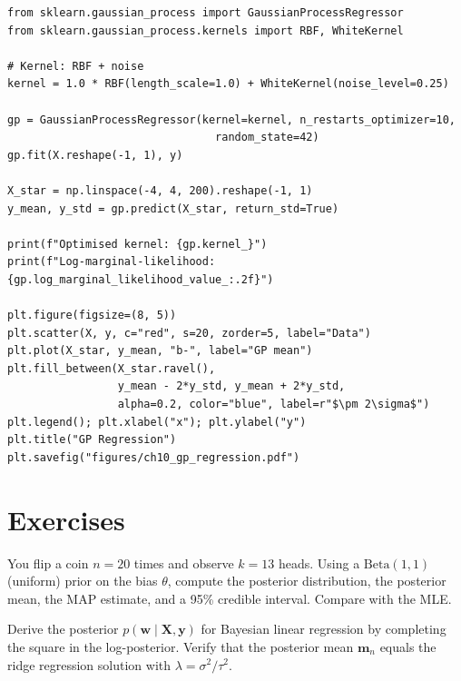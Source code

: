 \begin{codeblock}[title=\textbf{Gaussian Process Regression with scikit-learn}]
\begin{verbatim}
from sklearn.gaussian_process import GaussianProcessRegressor
from sklearn.gaussian_process.kernels import RBF, WhiteKernel

# Kernel: RBF + noise
kernel = 1.0 * RBF(length_scale=1.0) + WhiteKernel(noise_level=0.25)

gp = GaussianProcessRegressor(kernel=kernel, n_restarts_optimizer=10,
                                random_state=42)
gp.fit(X.reshape(-1, 1), y)

X_star = np.linspace(-4, 4, 200).reshape(-1, 1)
y_mean, y_std = gp.predict(X_star, return_std=True)

print(f"Optimised kernel: {gp.kernel_}")
print(f"Log-marginal-likelihood: {gp.log_marginal_likelihood_value_:.2f}")

plt.figure(figsize=(8, 5))
plt.scatter(X, y, c="red", s=20, zorder=5, label="Data")
plt.plot(X_star, y_mean, "b-", label="GP mean")
plt.fill_between(X_star.ravel(),
                 y_mean - 2*y_std, y_mean + 2*y_std,
                 alpha=0.2, color="blue", label=r"$\pm 2\sigma$")
plt.legend(); plt.xlabel("x"); plt.ylabel("y")
plt.title("GP Regression")
plt.savefig("figures/ch10_gp_regression.pdf")
\end{verbatim}
\end{codeblock}

\section{Exercises}

\begin{exercise}
You flip a coin $n=20$ times and observe $k=13$ heads. Using a $\text{Beta}(1,1)$ (uniform) prior on the bias $\theta$, compute the posterior distribution, the posterior mean, the MAP estimate, and a 95\% credible interval. Compare with the MLE.
\end{exercise}

\begin{exercise}
Derive the posterior $p(\bm{w}\mid\bm{X},\bm{y})$ for Bayesian linear regression by completing the square in the log-posterior. Verify that the posterior mean $\bm{m}_n$ equals the ridge regression solution with $\lambda=\sigma^2/\tau^2$.
\end{exercise}

